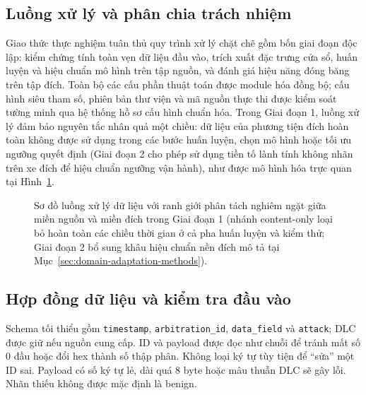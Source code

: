 \documentclass[12pt, a4paper, reqno, oneside]{book}
\DeclareRobustCommand{\code}[1]{\nolinkurl{#1}}
\begin{document}
\subsection{Luồng xử lý và phân chia trách nhiệm}
Giao thức thực nghiệm tuân thủ quy trình xử lý chặt chẽ gồm bốn giai đoạn độc lập: kiểm chứng tính toàn vẹn dữ liệu đầu vào, trích xuất đặc trưng cửa sổ, huấn luyện và hiệu chuẩn mô hình trên tập nguồn, và đánh giá hiệu năng đóng băng trên tập đích. Toàn bộ các cấu phần thuật toán được module hóa đồng bộ; cấu hình siêu tham số, phiên bản thư viện và mã nguồn thực thi được kiểm soát tường minh qua hệ thống hồ sơ cấu hình chuẩn hóa. Trong Giai đoạn 1, luồng xử lý đảm bảo nguyên tắc nhân quả một chiều: dữ liệu của phương tiện đích hoàn toàn không được sử dụng trong các bước huấn luyện, chọn mô hình hoặc tối ưu ngưỡng quyết định (Giai đoạn 2 cho phép sử dụng tiền tố lành tính không nhãn trên xe đích để hiệu chuẩn ngưỡng vận hành), như được mô hình hóa trực quan tại Hình~\ref{fig:pipeline}.

\begin{figure}[htbp]\centering
{}
\caption[Sơ đồ luồng xử lý và ranh giới nhân quả nguồn--đích]{Sơ đồ luồng xử lý dữ liệu với ranh giới phân tách nghiêm ngặt giữa miền nguồn và miền đích trong Giai đoạn 1 (nhánh content-only loại bỏ hoàn toàn các chiều thời gian ở cả pha huấn luyện và kiểm thử; Giai đoạn 2 bổ sung khâu hiệu chuẩn nền đích mô tả tại Mục~\ref{sec:domain-adaptation-methods}).}\label{fig:pipeline}
\end{figure}

\subsection{Hợp đồng dữ liệu và kiểm tra đầu vào}
Schema tối thiểu gồm \code{timestamp}, \code{arbitration_id}, \code{data_field} và \code{attack}; DLC được giữ nếu nguồn cung cấp. ID và payload được đọc như chuỗi để tránh mất số 0 đầu hoặc đổi hex thành số thập phân. Không loại ký tự tùy tiện để ``sửa'' một ID sai. Payload có số ký tự lẻ, dài quá 8 byte hoặc mâu thuẫn DLC sẽ gây lỗi. Nhãn thiếu không được mặc định là benign.
\end{document}
